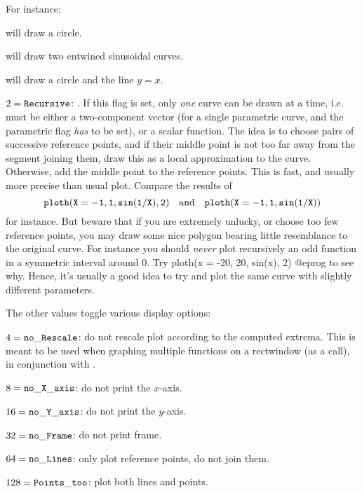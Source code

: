 For instance:

 will draw a circle.

 will draw two entwined sinusoidal
curves.

 will draw a circle and the line
$y=x$.

\item $2 = {\tt Recursive}$: . If this flag is set,
only \emph{one} curve can be drawn at a time, i.e.~ must be either a
two-component vector (for a single parametric curve, and the parametric flag
\emph{has} to be set), or a scalar function. The idea is to choose pairs of
successive reference points, and if their middle point is not too far away
from the segment joining them, draw this as a local approximation to the
curve. Otherwise, add the middle point to the reference points. This is
fast, and usually more precise than usual plot. Compare the results of
$${\tt ploth(X=-1,1,sin(1/X),2)}\quad
 {\rm and}\quad{\tt ploth(X=-1,1,sin(1/X))}$$
for instance. But beware that if you are extremely unlucky, or choose too few
reference points, you may draw some nice polygon bearing little resemblance
to the original curve. For instance you should \emph{never} plot recursively
an odd function in a symmetric interval around 0. Try
\bprog
  ploth(x = -20, 20, sin(x), 2)
@eprog\noindent
to see why. Hence, it's usually a good idea to try and plot the same curve
with slightly different parameters.

The other values toggle various display options:

\item $4 = {\tt no\_Rescale}$: do not rescale plot according to the
computed extrema. This is meant to be used when graphing multiple functions
on a rectwindow (as a  call), in conjunction with
.

\item $8 = {\tt no\_X\_axis}$: do not print the $x$-axis.

\item $16 = {\tt no\_Y\_axis}$: do not print the $y$-axis.

\item $32 = {\tt no\_Frame}$: do not print frame.

\item $64 = {\tt no\_Lines}$: only plot reference points, do not join them.

\item $128 = {\tt Points\_too}$: plot both lines and points.

